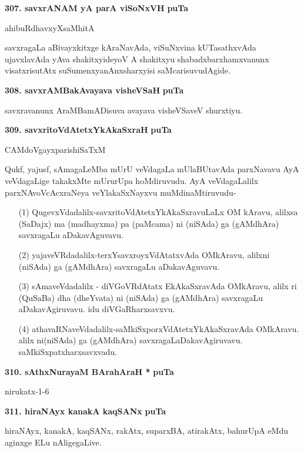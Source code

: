 {\eject

\textbf{307. savxrANAM yA parA viSoNxVH} \hfill {\bf puTa \pageref{152}}

\hfill ahibuRdhavxyXsaMhitA

\smallskip
savxragaLa aBivayxkitxge kAraNavAda, viSuNxvina kUTasathxvAda ujavxlavAda yAva shakitxyideyoV A shakitx\-yu shabadxbarxhamxvanunx visatxrisutAtx suSumenxyanAnxsharxyisi saMcarisuvudAgide.

\medskip
\noindent
\textbf{308. savxrAMBakAvayava visheVSaH} \hfill {\bf puTa \pageref{172}}

\smallskip
savxravanunx AraMBamADisuva avayava visheVSaveV shurxtiyu.

\medskip
\noindent
\textbf{309. savxritoVdAtetxYkAkaSxraH} \hfill {\bf puTa \pageref{156}}

\hfill CAMdoVgayxparishiSaTxM

\smallskip
Qukf, yajusf, sAmagaLeMba mUrU veVdagaLa mUlaBUtavAda parxNavavu AyA veVda\-gaLige takakxMte mUrurUpa hoMdiruvudu. AyA veVdagaLalilx parxNAvoVcAcxraNeya veYlakaSxNayxvu muMdi\-naMtiruvudu-

\begin{itemize}
\item[(1)] QugevxVdadalilx-savxritoVdAtetxYkAkaSxravuLaLx OM kAravu, alilxsa (SaDajx) ma (madhayxma) pa (paMcama) ni (niSAda) ga (gAMdhAra) savxragaLu aDakavAguvavu.

\item[(2)] yajaveVRdadalilx-terxYsavxroyxVdAtatxvAda OMkAravu, alilxni (niSAda) ga (gAMdhAra) savxragaLu aDaka\-vAguvavu.

\item[(3)] sAmaveVdadalilx - diVGoVRdAtatx EkAkaSxravAda OMkAravu, alilx ri (QuSaBa) dha (dheYvata) ni (niSAda) ga (gAMdhAra) savxragaLu aDakavAgiruvavu. idu diVGaRharxsavxvu.

\item[(4)] athavaRNaveVdadalilx-saMkiSxporxVdAtetxYkAkaSxravAda OMkAravu. alilx ni(niSAda) ga (gAMdhAra) savxragaLaDakavAgiruvavu. saMkiSxpatxharxsavxvadu. 

\end{itemize}

\noindent
\textbf{310. sAthxNurayaM BArahAraH *} \hfill {\bf puTa \pageref{39}}

\hfill nirukatx-1-6

\medskip
\noindent
\textbf{311. hiraNAyx kanakA kaqSANx} \hfill {\bf puTa \pageref{116}}

\smallskip
hiraNAyx, kanakA, kaqSANx, rakAtx, suparxBA, atirakAtx, bahurUpA eMdu aginxge ELu nAligegaLive.

}
